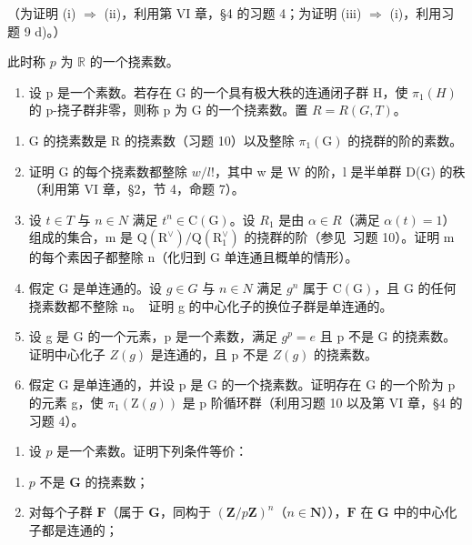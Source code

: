 \begin{enumerate}
（为证明 (i) \(\Longrightarrow\) (ii)，利用第 VI 章，§4 的习题 4；为证明 (iii) \(\Longrightarrow\) (i)，利用习题 9 d)。）

此时称 \(p\) 为 \(\mathbb{R}\) 的一个挠素数。

\begin{enumerate}
\def\labelenumi{\arabic{enumi})}
\setcounter{enumi}{10}
\tightlist
\item
  设 p 是一个素数。若存在 G 的一个具有极大秩的连通闭子群 H，使 \(\pi_{1}(H)\) 的 p-挠子群非零，则称 p 为 G 的一个挠素数。置 \(R = R(G, T)\)。
\end{enumerate}

\begin{enumerate}
\def\labelenumi{\alph{enumi})}
\item
  G 的挠素数是 R 的挠素数（习题 10）以及整除 \(\pi_1(\mathrm{G})\) 的挠群的阶的素数。
\item
  证明 G 的每个挠素数都整除 \(w/l!\)，其中 w 是 W 的阶，l 是半单群 D(G) 的秩（利用第 VI 章，§2，节 4，命题 7）。
\item
  设 \(t \in T\) 与 \(n \in N\) 满足 \(t^{n} \in \mathrm{C}(\mathrm{G})\)。设 \(R_{1}\) 是由 \(\alpha \in R\)（满足 \(\alpha(t) = 1\)）组成的集合，m 是 \(\mathrm{Q}(\mathrm{R}^{\vee}) / \mathrm{Q}(\mathrm{R}_{1}^{\vee})\) 的挠群的阶（参见~习题 10）。证明 m 的每个素因子都整除 n（化归到 G 单连通且概单的情形）。
\item
  假定 G 是单连通的。设 \(g \in G\) 与 \(n \in N\) 满足 \(g^{n}\) 属于 \(\mathrm{C}(\mathrm{G})\)，且 G 的任何挠素数都不整除 n。~证明 g 的中心化子的换位子群是单连通的。
\item
  设 g 是 G 的一个元素，p 是一个素数，满足 \(g^{p} = e\) 且 p 不是 G 的挠素数。证明中心化子 \(Z(g)\) 是连通的，且 p 不是 \(Z(g)\) 的挠素数。
\item
  假定 G 是单连通的，并设 p 是 G 的一个挠素数。证明存在 G 的一个阶为 p 的元素 g，使 \(\pi_{1}(\mathrm{Z}(g))\) 是 p 阶循环群（利用习题 10 以及第 VI 章，§4 的习题 4）。
\end{enumerate}

\begin{enumerate}
\def\labelenumi{\arabic{enumi})}
\setcounter{enumi}{11}
\tightlist
\item
  设 \(p\) 是一个素数。证明下列条件等价：
\end{enumerate}

\begin{enumerate}
\def\labelenumi{(\roman{enumi})}
\item
  \(p\) 不是 \(\mathbf{G}\) 的挠素数；
\item
  对每个子群 \(\mathbf{F}\)（属于 \(\mathbf{G}\)，同构于 \((\mathbf{Z} / p\mathbf{Z})^n\)（\(n\in \mathbf{N}\)）），\(\mathbf{F}\) 在 \(\mathbf{G}\) 中的中心化子都是连通的；
\end{enumerate}


\end{enumerate}
